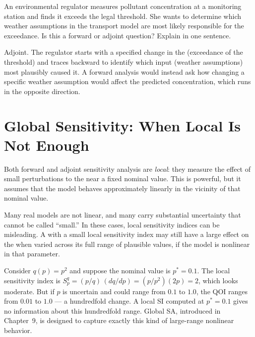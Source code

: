 \begin{selfcheck}
An environmental regulator measures pollutant concentration at a
monitoring station and finds it exceeds the legal threshold.
She wants to determine which weather assumptions in the
transport model are most likely responsible for the exceedance.
Is this a forward or adjoint question? Explain in one sentence.
\end{selfcheck}
\begin{scAnswer}
Adjoint. The regulator starts with a specified change in the \QOI
(exceedance of the threshold) and traces backward to identify which
input \POIs (weather assumptions) most plausibly caused it.
A forward analysis would instead ask how changing a specific weather
assumption would affect the predicted concentration, which runs in the opposite
direction.
\end{scAnswer}

\section{Global Sensitivity: When Local Is Not Enough}
\label{sec:globalSA}

Both forward and adjoint sensitivity analysis are \emph{local}:
they measure the effect of small perturbations to the \POIs
near a fixed nominal value. This is powerful, but it assumes
that the model behaves approximately linearly in the vicinity
of that nominal value.

Many real models are not linear, and many \POIs carry substantial
uncertainty that cannot be called ``small.'' In these cases,
local sensitivity indices can be misleading. A \POI with a
small local sensitivity index may still have a large effect
on the \QOI when varied across its full range of plausible values,
if the model is nonlinear in that parameter.

\begin{example}
\label{ex:local_global}
Consider $q(p) = p^2$ and suppose the nominal value is $p^* = 0.1$.
The local sensitivity index is $S_p^q = (p/q)\,(dq/dp) = (p/p^2)(2p) = 2$,
which looks moderate.
But if $p$ is uncertain and could range from $0.1$ to $1.0$,
the QOI ranges from $0.01$ to $1.0$ --- a hundredfold change.
A local SI computed at $p^* = 0.1$ gives no information about
this hundredfold range.
Global SA, introduced in Chapter~9, is designed to capture exactly
this kind of large-range nonlinear behavior.
\end{example}

